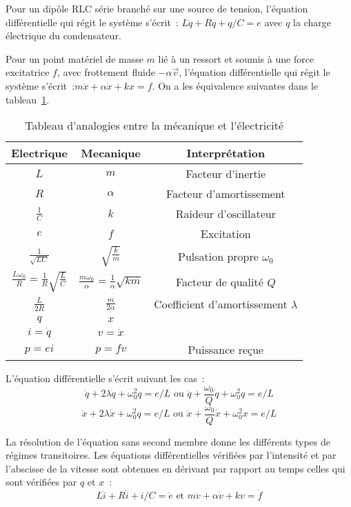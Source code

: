 Pour un dipôle RLC série branché sur une source de tension, l'équation
différentielle qui régit le système s'écrit~: \(L \ddot{q} + R\dot{q} + q/C =
e\) avec \(q\) la charge électrique du condensateur.

Pour un point matériel de masse \(m\) lié à un ressort et soumis à une force
excitatrice \(f\), avec frottement fluide \(-\alpha \vec{v}\), l'équation
différentielle qui régit le système s'écrit~:\(m\ddot{x}+\alpha \dot{x}+k x =
f\). On a les équivalence suivantes dans le tableau~\ref{tab:equiv}.

\begin{table}[h]%
  \centering
  \begin{tabular}{||c|c|c||}
    \hline
    Electrique & Mecanique & Interprétation\\
    \hline
    \(L\) & \(m\) & Facteur d'inertie\\
    \(R\) & \(\alpha\) & Facteur d'amortissement\\
    \(\frac{1}{C}\) & \(k\) & Raideur d'oscillateur\\
    \(e\) & \(f\) & Excitation\\
    \(\frac{1}{\sqrt{LC}}\) & \(\sqrt{\frac{k}{m}}\) & Pulsation propre
    \(\omega_0\)\\
    \(\frac{L\omega_0}{R} = \frac{1}{R}\sqrt{\frac{L}{C}}\) &
    \(\frac{m\omega_0}{\alpha} = \frac{1}{\alpha}\sqrt{km}\) & Facteur de
    qualité \(Q\)\\
    \(\frac{L}{2R}\) & \(\frac{m}{2\alpha}\) & Coefficient d'amortissement
    \(\lambda\)\\
    \(q\) & \(x\) & \\
    \(i=\dot{q}\) & \(v=\dot{x}\) & \\
    \(p=ei\) & \(p=fv\) & Puissance reçue\\
    \hline
  \end{tabular}
  \caption{Tableau d'analogies entre la mécanique et l'électricité}
  \label{tab:equiv}
\end{table}%

L'équation différentielle s'écrit suivant les cas~:
\[\ddot{q}+2\lambda\dot{q}+\omega_0^2 q = e/L \text{~ou~}
\ddot{q}+\frac{\omega_0}{Q}\dot{q}+\omega_0^2 q = e/L\]%
\[\ddot{x}+2\lambda\dot{x}+\omega_0^2 q = e/L \text{~ou~}
\ddot{x}+\frac{\omega_0}{Q}\dot{x}+\omega_0^2 x = e/L\]%

La résolution de l'équation sans second membre donne les différents types de
régimes transitoires. Les équations différentielles vérifiées par l'intensité 
et
par l'abscisse de la vitesse sont obtenues en dérivant par rapport au temps
celles qui sont vérifiées par \(q\) et \(x\)~:
\[L\ddot{i}+R\dot{i}+i/C = \dot{e} \text{~et~} m\ddot{v}+\alpha\dot{v}+kv =
\dot{f}\]%

